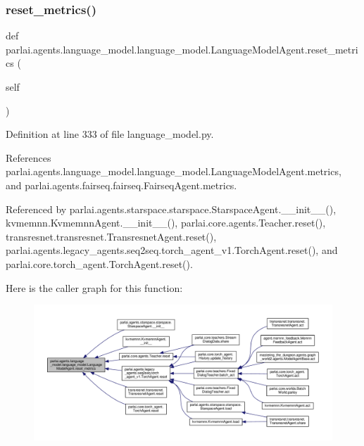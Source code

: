 \subsubsection{\texorpdfstring{reset\+\_\+metrics()}{reset\_metrics()}}
{\footnotesize\ttfamily def parlai.\+agents.\+language\+\_\+model.\+language\+\_\+model.\+Language\+Model\+Agent.\+reset\+\_\+metrics (\begin{DoxyParamCaption}\item[{}]{self }\end{DoxyParamCaption})}



Definition at line 333 of file language\+\_\+model.\+py.



References parlai.\+agents.\+language\+\_\+model.\+language\+\_\+model.\+Language\+Model\+Agent.\+metrics, and parlai.\+agents.\+fairseq.\+fairseq.\+Fairseq\+Agent.\+metrics.



Referenced by parlai.\+agents.\+starspace.\+starspace.\+Starspace\+Agent.\+\_\+\+\_\+init\+\_\+\+\_\+(), kvmemnn.\+Kvmemnn\+Agent.\+\_\+\+\_\+init\+\_\+\+\_\+(), parlai.\+core.\+agents.\+Teacher.\+reset(), transresnet.\+transresnet.\+Transresnet\+Agent.\+reset(), parlai.\+agents.\+legacy\+\_\+agents.\+seq2seq.\+torch\+\_\+agent\+\_\+v1.\+Torch\+Agent.\+reset(), and parlai.\+core.\+torch\+\_\+agent.\+Torch\+Agent.\+reset().

Here is the caller graph for this function\+:
\nopagebreak
\begin{figure}[H]
\begin{center}
\leavevmode
\includegraphics[width=350pt]{classparlai_1_1agents_1_1language__model_1_1language__model_1_1LanguageModelAgent_a62896fd9aa38b55c6ea1b8a8770e3261_icgraph}
\end{center}
\end{figure}
\mbox{\label{classparlai_1_1agents_1_1language__model_1_1language__model_1_1LanguageModelAgent_adc621ff0e625e2f00225d78408e9bafc}} 

